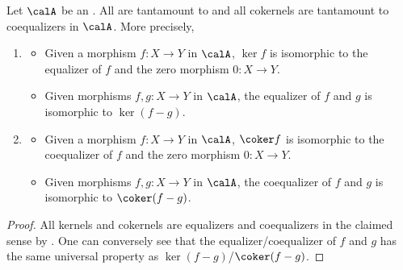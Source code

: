 \begin{lemma} \label{lemma:kernels_and_cokernels_are_tantamount_to_equalizers_and_coequalizers_in_abelian_categories}
    Let $\calA$ be an . All  are tantamount to  and all cokernels are tantamount to coequalizers in $\calA$. More precisely, 
    \begin{enumerate}
        \item
        \begin{itemize}
        \item Given a morphism $f: X \to Y$ in $\calA$, $\ker f$ is isomorphic to the equalizer of $f$ and the zero morphism $0:X \to Y$. 
        \item Given morphisms $f,g: X \to Y$ in $\calA$, the equalizer of $f$ and $g$ is isomorphic to $\ker(f-g)$.  
        \end{itemize}

        \item
        \begin{itemize}
        \item Given a morphism $f: X \to Y$ in $\calA$, $\coker f$ is isomorphic to the coequalizer of $f$ and the zero morphism $0:X \to Y$. 
        \item Given morphisms $f,g: X \to Y$ in $\calA$, the coequalizer of $f$ and $g$ is isomorphic to $\coker(f-g)$.  
        \end{itemize}
    \end{enumerate}
\end{lemma}

\begin{proof}
    All kernels and cokernels are equalizers and coequalizers in the claimed sense by . One can conversely see that the equalizer/coequalizer of $f$ and $g$ has the same universal property as $\ker(f-g)$/$\coker(f-g)$.
\end{proof}